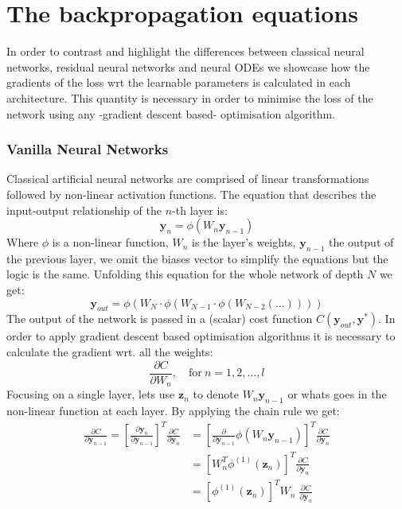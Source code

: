 \documentclass[11pt]{report}
\begin{document}
    \newpage
    \printbibliography

    \appendix


    \chapter{The backpropagation equations}
    In order to contrast and highlight the differences between classical neural networks, residual neural networks and
    neural ODEs we showcase how the gradients of the loss wrt the learnable parameters is calculated in each architecture.
    This quantity is necessary in order to minimise the loss of the network using any -gradient descent based- optimisation algorithm.

    \subsection{Vanilla Neural Networks}
    Classical artificial neural networks are comprised of linear transformations followed by non-linear activation functions.
    The equation that describes the input-output relationship of the $n$-th layer is:
    \begin{equation}
        \bm{y}_{n} = \phi( W_{n} \bm{y}_{n-1} )
    \end{equation}
    Where $\phi$ is a non-linear function, $W_n$ is the layer's weights, $\bm{y}_{n-1}$ the output of the previous layer, we omit the biases vector to simplify the equations but the logic is the same.
    Unfolding this equation for the whole network of depth $N$ we get:
    \begin{equation}
        \bm{y}_{out} = \phi ( W_{N} \cdot \phi(W_{N-1} \cdot  \phi(W_{N-2}( \dots ))))
    \end{equation}
    The output of the network is passed in a (scalar) cost function $C(\bm{y}_{out},\bm{y}^*)$.
    In order to apply gradient descent based optimisation algorithms it is necessary to calculate the gradient wrt.
    all the weights:
    \begin{equation}
        \frac{ \partial C}{\partial W_{n} }, \quad \text{for} \ n=1,2,\dots,l
    \end{equation}
    Focusing on a single layer, lets use $\textbf{z}_{n}$ to denote $W_{n} \textbf{y}_{n-1}$ or whats goes in the non-linear function at each layer.
    By applying the chain rule we get:
    \begin{align}
        \frac{ \partial C}{\partial \textbf{y}_{n-1} }
        =
        \left[ \frac{ \partial \textbf{y}_{n}}{\partial \textbf{y}_{n-1}  } \right]^T
        \frac{ \partial C}{\partial \textbf{y}_{n} }
        &=
        \left[ \frac{ \partial}{\partial \textbf{y}_{n-1} } \phi(W_n \textbf{y}_{n-1}) \right]^T
        \frac{ \partial C}{\partial \textbf{y}_{n} }
        \\
        &=
        \left[ W_n^T \phi^{(1)}( \pmb{z}_n ) \right]^T
        \frac{ \partial C}{\partial \textbf{y}_{n} }
        \\
        &=
        \left[ \phi^{(1)}( \pmb{z}_n ) \right]^T
        W_n \;
        \frac{ \partial C}{\partial \textbf{y}_{n} }
    \end{align}
\end{document}
